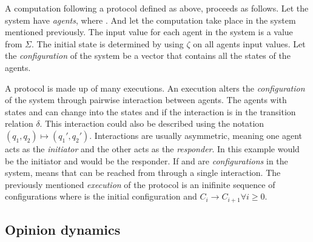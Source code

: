 A computation following a protocol defined as above, proceeds as follows. Let the system have  \emph{agents}, where . And let the computation take place in the system mentioned previously. The input value for each agent in the system is a value from $\Sigma$. The initial state is determined by using $\zeta$ on all agents input values. Let the \emph{configuration} of the system be a vector  that contains all the states of the agents. 

A protocol is made up of many executions. An execution alters the \emph{configuration} of the system through pairwise interaction between agents. The agents with states  and  can change into the states  and  if the interaction  is in the transition relation $\delta$. This interaction could also be described using the notation $(q_1, q_2) \mapsto (q_1', q_2')$. Interactions are usually asymmetric, meaning one agent acts as the \emph{initiator} and the other acts as the \emph{responder}. In this example  would be the initiator and  would be the responder. If  and  are \emph{configurations} in the system,  means that  can be reached from  through a single interaction. The previously mentioned \emph{execution} of the protocol is an inifinite sequence of configurations  where  is the initial configuration and $C_i \rightarrow C_{i+1} \forall i \geq 0$. 


\subsection{Opinion dynamics}


